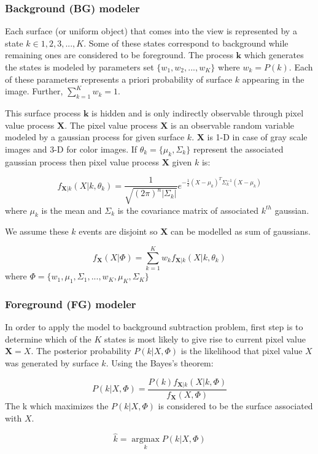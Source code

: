 \subsubsection{Background (BG) modeler}
Each surface (or uniform object) that comes into the view is represented by a state $k \in {1,2,3,...,K}$. Some of these states correspond to  background while remaining ones are considered to be foreground. The process  $\mathbf{k}$ which generates the states is modeled by parameters set $\{w_1, w_2, ..., w_K\}$ where $w_k = P(k)$. Each of these parameters represents  a priori probability of surface $k$ appearing in the image. Further, $\sum_{k=1}^K w_k=1$. 

This surface process $\mathbf{k}$ is hidden and is only indirectly observable through pixel value process $\mathbf{X}$. The pixel value process $\mathbf{X}$ is an observable random variable modeled by a gaussian process for given surface $k$. $\mathbf{X}$ is 1-D in case of gray scale images and 3-D for color images.  If $\theta_k= \{\mu_k, \Sigma_k \}$  represent the associated gaussian process then pixel value process $\mathbf{X}$ given $k$ is: 

$$ f_{\mathbf{X}|k}(X|k,\theta_k)=\frac{1}{\sqrt{(2\pi)^n |\Sigma_k |}}e^{-\frac{1}{2}(X-\mu_k)^T \Sigma_k^{-1} (X-\mu_k)} $$
where $\mu_k$ is the mean and $\Sigma_k$ is the covariance matrix of associated $k^{th}$ gaussian. 

We assume these $k$ events are disjoint so $\mathbf{X}$ can be modelled as sum of gaussians. 

$$ f_{\mathbf{X}}(X|\Phi)=\sum_{k=1}^K w_k f_{\mathbf{X}|k}(X|k,\theta_k)  $$
where $ \Phi = \{w_1, \mu_1, \Sigma_1,..., w_K, \mu_K, \Sigma_K \}$ 

\subsubsection{Foreground (FG) modeler}
In order to apply the model to background subtraction problem, first step is to determine which of the $K$ states is most likely to give rise to current pixel value $\mathbf{X}=X$. The posterior probability $P(k|X,\Phi)$ is the likelihood that pixel value $X$ was generated by surface $k$. Using the Bayes's theorem:

$$ P(k|X,\Phi) = \frac{P(k)f_{\mathbf{X}|k}(X|k,\Phi)}{f_\mathbf{X}(X,\Phi)} $$
The k which maximizes the $P(k|X,\Phi) $ is considered to be the surface associated with $X$.

$$ \hat{k}=\operatorname*{argmax}_k P(k|X,\Phi)$$

